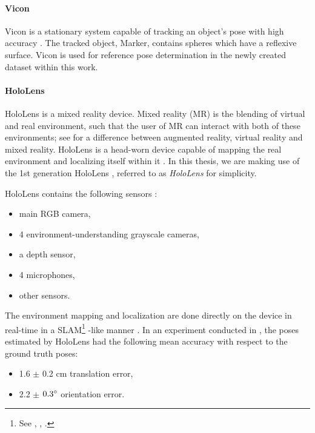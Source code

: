 \documentclass[twoside]{ctuthesis}
\theoremstyle{plain}
\theoremstyle{definition}
\theoremstyle{note}
\begin{document}
\paragraph{Vicon}
Vicon is a stationary system capable of tracking an object's pose with high accuracy \cite{Vicon}. The tracked object, Marker, contains spheres which have a reflexive surface. Vicon is used for reference pose determination in the newly created dataset within this work.

\paragraph{HoloLens}
HoloLens is a mixed reality device. Mixed reality (MR) is the blending of virtual and real environment, such that the user of MR can interact with both of these environments; see \cite{VR_AR_MR_taxonomy} for a difference between augmented reality, virtual reality and mixed reality. HoloLens is a head-worn device capable of mapping the real environment and localizing itself within it \cite{HoloLensEvaluation}. In this thesis, we are making use of the 1st generation HoloLens \cite{HoloLens1stGen}, referred to as \emph{HoloLens} for simplicity.

HoloLens contains the following sensors \cite{HoloLensEvaluation} \cite{HoloLens1stGen}:

\begin{itemize}
	\item main RGB camera,
	\item 4 environment-understanding grayscale cameras,
	\item a depth sensor,
	\item 4 microphones,
	\item other sensors.
\end{itemize}

The environment mapping and localization are done directly on the device in real-time in a SLAM\footnote{See \cite{SLAM1}, \cite{SLAM2}, \cite{SLAM3}.} -like manner \cite{HoloLensEvaluation}. In an experiment conducted in \cite{HoloLensEvaluation}, the poses estimated by HoloLens had the following mean accuracy with respect to the ground truth poses:

\begin{itemize}
	\item 1.6 $\pm$ 0.2 cm translation error,
	\item 2.2 $\pm$ $0.3\degree$ orientation error.
\end{itemize}
\end{document}
